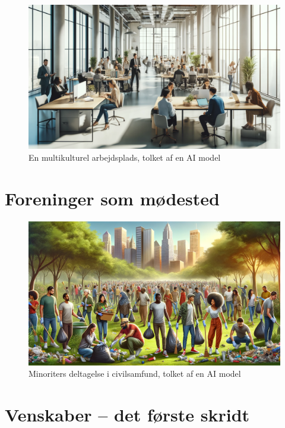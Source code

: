 \documentclass[
]{book}
\begin{document}
\begin{figure}
\includegraphics[width=1\linewidth]{images/dalle-work} \caption{En multikulturel arbejdsplads, tolket af en AI model}\label{fig:fig-work}
\end{figure}

\hypertarget{kap5}{%
\chapter{Foreninger som mødested}\label{kap5}}

\begin{figure}
\includegraphics[width=1\linewidth]{images/dalle-civil} \caption{Minoriters deltagelse i civilsamfund, tolket af en AI model}\label{fig:fig-civil}
\end{figure}

\hypertarget{kap6}{%
\chapter{Venskaber -- det første skridt}\label{kap6}}
\end{document}
